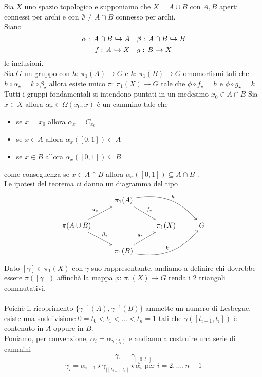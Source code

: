 \begin{thm}\bianco
Sia $X$ uno spazio topologico e supponiamo che $X=A\cup B$ con $A,B$ aperti connessi per archi e con $\emptyset\neq A\cap B$ connesso per archi.\\
Siano 
$$\alpha:\, A \cap B \hookrightarrow A \quad \beta:\, A \cap B \hookrightarrow B  $$
$$ f: \, A \hookrightarrow X \quad g:\, B \hookrightarrow X$$
le inclusioni.\\
Sia $G$ un gruppo con  $h:\, \pi_1(A) \to G$ e $k:\, \pi_1(B) \to G$ omomorfismi tali che $ h \circ \alpha_\star = k \circ \beta_\star$ allora esiste unico $\pi:\, \pi_1(X) \to G $ tale che $\phi \circ f_\star=h$ e $ \phi \circ g_\star = k $\\
Tutti i gruppi fondamentali si intendono puntati in un medesimo $x_0\in A \cap B$ 
\proof 
Sia $x\in X$ allora $\alpha_x\in \Omega(x_0,x)$ \`e un cammino tale che 
\begin{itemize}
\item se $x=x_0$ allora $\alpha_x=C_{x_0}$
\item se $x\in A $ allora $\alpha_x( [0,1])\subset A $
\item se $x\in B$ allora $\alpha_x([0,1])\subseteq B$
\end{itemize}
come conseguenza se $x\in A\cap B$ allora $\alpha_x([0,1])\subseteq A\cap B$ .\\
Le ipotesi del teorema ci danno un diagramma del tipo 
$$ \begin{tikzcd}
															& \pi_1(A) \arrow{rd}{f_\star}  \arrow[bend left]{rrd}{h} \\
\pi(A\cup B) \arrow{ru}{\alpha_\star}	 \arrow{rd}{\beta_\star}											 & & \pi_1(X) & G \\
															&\pi_1(B) \arrow{ru}{g_\star} \arrow[bend right]{rru}{k}											
\end{tikzcd}$$
Dato $[\gamma]\in \pi_1(X)$ con $\gamma$ suo rappresentante, andiamo a definire chi dovrebbe essere $\pi([\gamma])$ affinch\`a la mappa $\phi:\, \pi_1(X) \to G$ renda i 2 triangoli commutativi.\\ \\ 
Poich\`e il ricoprimento $\{\gamma^{-1}(A), \gamma^{-1}(B)\}$ ammette un numero di Lesbegue, esiste una suddivisione $0=t_0< t_1< \dots < t_n=1$ tali che $\gamma([t_{i-1},t_i])$ \`e contenuto in $A$ oppure in $B$.\\
Poniamo, per convenzione, $\alpha_i= \alpha_{\gamma(t_i)}$ e andiamo a costruire una serie di cammini 
$$ \gamma_1= \gamma_{\vert [ 0,t_1]} $$
$$ \gamma_i= \alpha_{i-1} \star \gamma_{\vert [ t_{i-1}, t_i]} \star \overline{\alpha_i} \text{ per } i = 2, \dots , n-1 $$

\end{thm}
